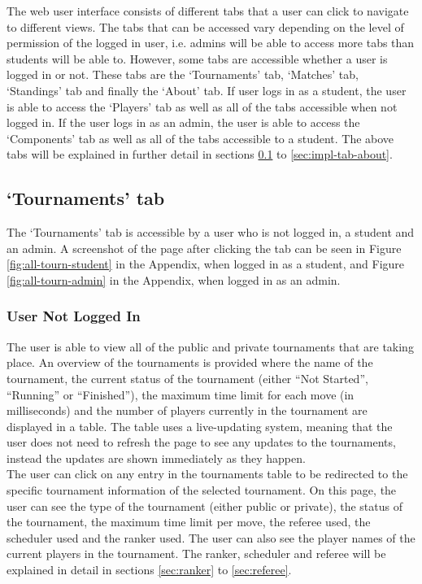 \documentclass[a4paper, 11pt]{report}
\begin{document}
The web user interface consists of different tabs that a user can click to navigate
to different views. The tabs that can be accessed vary depending on the level of
permission of the logged in user, i.e. admins will be able to access more tabs
than students will be able to. However, some tabs are accessible whether a user
is logged in or not. These tabs are the `Tournaments' tab, `Matches' tab,
`Standings' tab and finally the `About' tab. If user logs in as a student, the
user is able to access the `Players' tab as well as all of the tabs accessible
when not logged in. If the user logs in as an admin, the user is able to access
the `Components' tab as well as all of the tabs accessible to a student. The
above tabs will be explained in further detail in sections
\ref{sec:impl-tab-tournaments} to \ref{sec:impl-tab-about}.

\subsection{`Tournaments' tab}
\label{sec:impl-tab-tournaments}

The `Tournaments' tab is accessible by a user who is not logged in, a student
and an admin. A screenshot of the page after clicking the tab can be seen in
Figure \ref{fig:all-tourn-student} in the Appendix, when logged in as a student,
and Figure \ref{fig:all-tourn-admin} in the Appendix, when logged in as an
admin.

\subsubsection*{User Not Logged In}

The user is able to view all of the public and private tournaments that are
taking place. An overview of the tournaments is provided where the name of the
tournament, the current status of the tournament (either ``Not Started'',
``Running'' or ``Finished''), the maximum time limit for each move (in milliseconds)
and the number of players currently in the tournament are displayed in a table.
The table uses a live-updating system, meaning that the user does not need to
refresh the page to see any updates to the tournaments, instead the updates are
shown immediately as they happen. \\

The user can click on any entry in the tournaments table to be redirected to
the specific tournament information of the selected tournament. On this page, the
user can see the type of the tournament (either public or private), the status
of the tournament, the maximum time limit per move, the referee used, the scheduler
used and the ranker used. The user can also see the player names of the current
players in the tournament. The ranker, scheduler and referee will be explained
in detail in sections \ref{sec:ranker} to \ref{sec:referee}. \\
\end{document}
